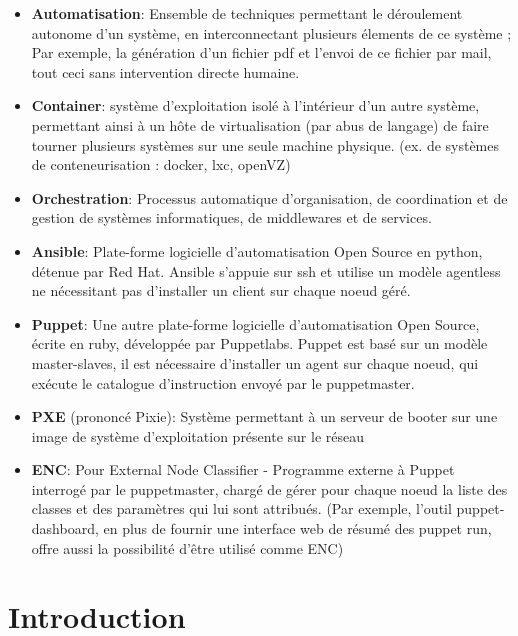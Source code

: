 \documentclass[14 pt,a4paper]{extreport}
\begin{document}
\begin{itemize}
\item{\textbf{Automatisation}}: Ensemble de techniques permettant le déroulement autonome d'un système, en interconnectant plusieurs élements de ce système ; Par exemple, la génération d'un fichier pdf et l'envoi de ce fichier par mail, tout ceci sans intervention directe humaine.

\item{\textbf{Container}}: système d'exploitation isolé à l'intérieur d'un autre système, permettant ainsi à un hôte de virtualisation (par abus de langage) de faire tourner plusieurs systèmes sur une seule machine physique. (ex. de systèmes de conteneurisation : docker, lxc, openVZ)

\item{\textbf{Orchestration}}: Processus automatique d'organisation, de coordination et de gestion de systèmes informatiques, de middlewares et de services.

\item{\textbf{Ansible}}: Plate-forme logicielle d'automatisation Open Source en python, détenue par Red Hat. Ansible s'appuie sur ssh et utilise un modèle agentless ne nécessitant pas d'installer un client sur chaque noeud géré.

\item{\textbf{Puppet}}: Une autre plate-forme logicielle d'automatisation Open Source, écrite en ruby, développée par Puppetlabs. Puppet est basé sur un modèle master-slaves, il est nécessaire d'installer un agent sur chaque noeud, qui exécute le catalogue d'instruction envoyé par le puppetmaster.

\item{\textbf{PXE}} (prononcé Pixie): Système permettant à un serveur de booter sur une image de système d'exploitation présente sur le réseau

\item{\textbf{ENC}}: Pour External Node Classifier - Programme externe à Puppet interrogé par le puppetmaster, chargé de gérer pour chaque noeud la liste des classes et des paramètres qui lui sont attribués. (Par exemple, l'outil puppet-dashboard, en plus de fournir une interface web de résumé des puppet run, offre aussi la possibilité d'être utilisé comme ENC)

\end{itemize}

\chapter{Introduction}
\end{document}
